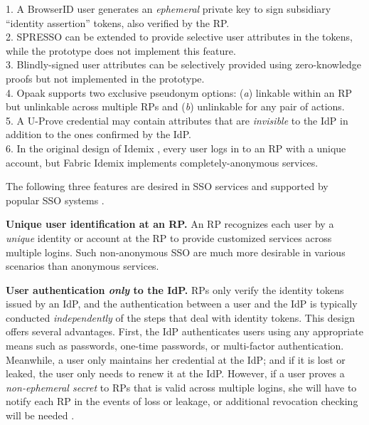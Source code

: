 \begin{table}[tb]
\begin{tabular}{|c|c|c|c|c|c|c|}
\end{tabular}
    \label{tbl:comparison-protocol}
\flushleft
{\footnotesize
1. A BrowserID user generates an \emph{ephemeral} private key to sign subsidiary ``identity assertion'' tokens,
also verified by the RP.\\
2. SPRESSO can be extended to provide selective user attributes in the tokens, while the prototype does not implement this feature.\\
3. Blindly-signed user attributes can be selectively provided using zero-knowledge proofs but not implemented in the prototype.\\
4. Opaak supports two exclusive pseudonym options: (\emph{a}) linkable within an RP but unlinkable across multiple RPs and (\emph{b}) unlinkable for any pair of actions.\\
5. A U-Prove credential may contain attributes that are \emph{invisible} to the IdP in addition to the ones confirmed by the IdP. \\
6. In the original design of Idemix \cite{idemix}, every user logs in to an RP with a unique account, but Fabric Idemix implements completely-anonymous services.
}
\end{table}

The following three features are desired in SSO services and supported by popular SSO systems \cite{NIST2017draft, OpenIDConnect,rfc6749, SAML, SAMLIdentifier}.

\noindent \textbf{Unique user identification at an RP.}
An RP recognizes each user by a \emph{unique} identity or account at the RP to provide customized services across multiple logins.
Such non-anonymous SSO are much more desirable in various scenarios than anonymous services.

\noindent\textbf{User authentication {\em only} to the IdP.}
RPs only verify the identity tokens issued by an IdP, and the authentication between a user and the IdP is typically conducted \emph{independently} of the steps that deal with identity tokens.
This design offers several advantages. First, the IdP authenticates users using any appropriate means such as passwords, one-time passwords, or multi-factor authentication.
Meanwhile, a user only maintains her credential at the IdP; and if it is lost or leaked, the user only needs to renew it at the IdP.
However, if a user proves a \emph{non-ephemeral secret} to RPs that is valid across multiple logins, she will have to notify each RP in the events of loss or leakage, or additional revocation checking will be needed \cite{ELPASSO, UnlimitID}.

